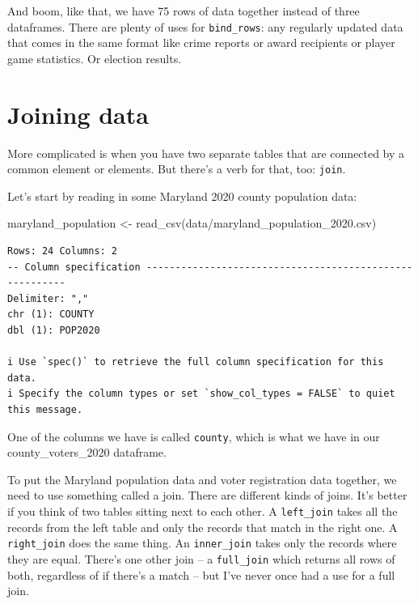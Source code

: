 \documentclass[
  letterpaper,
  DIV=11,
  numbers=noendperiod]{scrreprt}
\newenvironment{Shaded}{\begin{snugshade}}{\end{snugshade}}
\newcommand{\FunctionTok}[1]{\textcolor[rgb]{0.28,0.35,0.67}{#1}}
\newcommand{\NormalTok}[1]{\textcolor[rgb]{0.00,0.23,0.31}{#1}}
\newcommand{\OtherTok}[1]{\textcolor[rgb]{0.00,0.23,0.31}{#1}}
\newcommand{\StringTok}[1]{\textcolor[rgb]{0.13,0.47,0.30}{#1}}
\begin{document}
And boom, like that, we have 75 rows of data together instead of three
dataframes. There are plenty of uses for \texttt{bind\_rows}: any
regularly updated data that comes in the same format like crime reports
or award recipients or player game statistics. Or election results.

\hypertarget{joining-data}{%
\section{Joining data}\label{joining-data}}

More complicated is when you have two separate tables that are connected
by a common element or elements. But there's a verb for that, too:
\texttt{join}.

Let's start by reading in some Maryland 2020 county population data:

\begin{Shaded}
\begin{Highlighting}[]
\NormalTok{maryland\_population }\OtherTok{\textless{}{-}} \FunctionTok{read\_csv}\NormalTok{(}\StringTok{\textquotesingle{}data/maryland\_population\_2020.csv\textquotesingle{}}\NormalTok{)}
\end{Highlighting}
\end{Shaded}

\begin{verbatim}
Rows: 24 Columns: 2
-- Column specification --------------------------------------------------------
Delimiter: ","
chr (1): COUNTY
dbl (1): POP2020

i Use `spec()` to retrieve the full column specification for this data.
i Specify the column types or set `show_col_types = FALSE` to quiet this message.
\end{verbatim}

One of the columns we have is called \texttt{county}, which is what we
have in our county\_voters\_2020 dataframe.

To put the Maryland population data and voter registration data
together, we need to use something called a join. There are different
kinds of joins. It's better if you think of two tables sitting next to
each other. A \texttt{left\_join} takes all the records from the left
table and only the records that match in the right one. A
\texttt{right\_join} does the same thing. An \texttt{inner\_join} takes
only the records where they are equal. There's one other join -- a
\texttt{full\_join} which returns all rows of both, regardless of if
there's a match -- but I've never once had a use for a full join.
\end{document}
